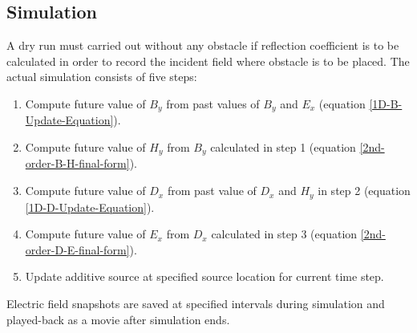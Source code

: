 \subsection{Simulation}
A dry run must carried out without any obstacle if reflection coefficient is to be calculated in order to record the incident field where obstacle is to be placed. The actual simulation consists of five steps:
\begin{enumerate}
\item Compute future value of $B_y$ from past values of $B_y$ and $E_x$ (equation \ref{1D-B-Update-Equation}).
\item Compute future value of $H_y$ from $B_y$ calculated in step 1 (equation \ref{2nd-order-B-H-final-form}).
\item Compute future value of $D_x$ from past value of $D_x$ and $H_y$ in step 2 (equation \ref{1D-D-Update-Equation}).
\item Compute future value of $E_x$ from $D_x$ calculated in step 3 (equation \ref{2nd-order-D-E-final-form}).
\item Update additive source at specified source location for current time step.
\end{enumerate}
Electric field snapshots are saved at specified intervals during simulation and played-back as a movie after simulation ends. 
